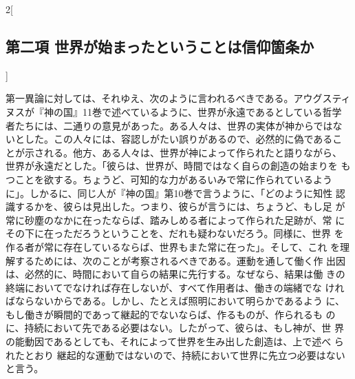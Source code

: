 \documentclass[paper=a4paper,fontsize=10pt,jafontsize=9pt,titlepage]{jlreq}
\begin{document}
\begin{paracol}{2}[\subsection{第二項 世界が始まったということは信仰箇条か}]
\switchcolumn


第一異論に対しては、それゆえ、次のように言われるべきである。アウグスティ
ヌスが『神の国』11巻で述べているように、世界が永遠であるとしている哲学
者たちには、二通りの意見があった。ある人々は、世界の実体が神からではな
いとした。この人々には、容認しがたい誤りがあるので、必然的に偽であるこ
とが示される。他方、ある人々は、世界が神によって作られたと語りながら、
世界が永遠だとした。「彼らは、世界が、時間ではなく自らの創造の始まりを
もつことを欲する。ちょうど、可知的な力があるいみで常に作られているよう
に」。しかるに、同じ人が『神の国』第10巻で言うように、「どのように知性
認識するかを、彼らは見出した。つまり、彼らが言うには、ちょうど、もし足
が常に砂塵のなかに在ったならば、踏みしめる者によって作られた足跡が、常
にその下に在っただろうということを、だれも疑わないだろう。同様に、世界
を作る者が常に存在しているならば、世界もまた常に在った」。そして、これ
を理解するためには、次のことが考察されるべきである。運動を通して働く作
出因は、必然的に、時間において自らの結果に先行する。なぜなら、結果は働
きの終端においてでなければ存在しないが、すべて作用者は、働きの端緒でな
ければならないからである。しかし、たとえば照明において明らかであるよう
に、もし働きが瞬間的であって継起的でないならば、作るものが、作られるも
のに、持続において先である必要はない。したがって、彼らは、もし神が、世
界の能動因であるとしても、それによって世界を生み出した創造は、上で述べ
られたとおり
継起的な運動ではないので、持続において世界に先立つ必要はないと言う。



\end{paracol}
\end{document}
